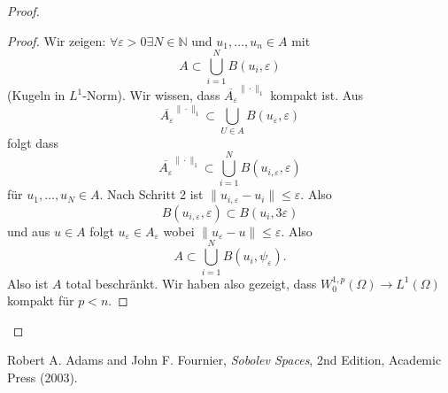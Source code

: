 \documentclass[
paper=a4,
bibtotocnumbered,
liststotocnumbered,
tablecaptionabove,
pointlessnumbers,
twoside,
openright,
10pt
]
{report}
\theoremstyle{definition}
\numberwithin{equation}{chapter}
\begin{document}
\begin{proof}
\begin{proof}
Wir zeigen: $\forall \varepsilon >0 \exists N \in \mathbb N$ und $u_1, \ldots, u_n \in A$ mit
\begin{equation}
 A \subset \bigcup_{i=1}^N B(u_i, \varepsilon)
\end{equation}
(Kugeln in $L^1$-Norm). Wir wissen, dass $\overline{A_\varepsilon}^{\|\cdot \|_1}$ kompakt ist. Aus
\begin{equation}
 \overline{A_\varepsilon}^{\|\cdot\|_1} \subset\bigcup_{U\in A} B(u_\varepsilon, \varepsilon)
\end{equation}
folgt dass
\begin{equation}
 \overline{A_\varepsilon}^{\|\cdot \|_1} \subset \bigcup_{i=1}^N B(u_{i,\varepsilon}, \varepsilon)
\end{equation}
für $u_1,\ldots, u_N \in A$. Nach Schritt 2 ist $\| u_{i,\varepsilon} - u_i \| \le \varepsilon$. Also
\begin{equation}
 B(u_{i,\varepsilon}, \varepsilon) \subset B(u_i, 3\varepsilon)
\end{equation}
und aus $u\in A$ folgt $u_\varepsilon \in A_\varepsilon$ wobei $\| u_\varepsilon - u\| \le \varepsilon$. Also
\begin{equation}
 A\subset \bigcup_{i=1}^N B(u_i, \psi_\varepsilon).
\end{equation}
Also ist $A$ total beschränkt. Wir haben also gezeigt, dass $W_0^{1,p}(\Omega) \to L^1(\Omega)$ kompakt für $p<n$.
\end{proof}
\end{proof}



\begin{thebibliography}{xxx}
 Robert A. Adams and John F.  Fournier, \textit{Sobolev Spaces}, 2nd Edition, Academic Press (2003).
\end{thebibliography}
\end{document}
